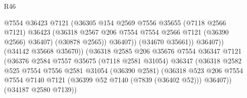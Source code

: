 \begin{lexlean}{R46}
\begin{coremodule}
                                          @7554
                                          @36423
                                          @7121
                                          (@36305
                                            @154
                                            @2569
                                            @7556
                                            @35655
                                            (@7118 @2566 @7121)
                                            @36423
                                            (@36318
                                              @2567
                                              @206
                                              @7554
                                              @7554
                                              @2566
                                              @7121
                                              (@36390 @2566)
                                              @36407)
                                            (@30878 @2565))
                                          @36407))
                                      (@34670 @35661))
                                    @36407))
                                (@34142 @35668 @35670))
                              (@36318
                                @2585
                                @206
                                @35676
                                @7554
                                @36347
                                @7121
                                (@36376
                                  @2584
                                  @7557
                                  @35675
                                  (@7118 @2581 @31054)
                                  @36347
                                  (@36318
                                    @2582
                                    @525
                                    @7554
                                    @7556
                                    @2581
                                    @31054
                                    (@36390 @2581)
                                    (@36318
                                      @523
                                      @206
                                      @7554
                                      @7554
                                      @7140
                                      @7121
                                      (@36399 @52 @7140 (@7839 (@36402 @52)))
                                      @36407))
                                  (@34187 @2580 @7139))

\end{coremodule}
\end{lexlean}
